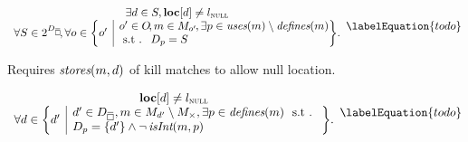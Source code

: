 

\begin{equation}
  \begin{array}{c}
    \exists d \in S, \mVar{loc}[d] \neq \mNullLocation \\
    \forall S \in \mPowerset{\mStateDataCompSet} \hspace{-2pt},
    \forall o \in
      \mSetBuilder*{o'}%
                   {%
                     \begin{array}{@{}l@{}}
                       o' \in \mOpSet \!,
                       m \in \mMatchSet[o'] \hspace{-1pt},
                       \exists p \in \mUses(m) \setminus \mDefines(m) \\
                       \text{\st }
                       \mDataSet[p] = S
                     \end{array}
                   } \!.
  \end{array}
  \labelEquation{todo}
\end{equation}

Requires \mbox{$\operatorname{\textit{stores}}(m, d)$} of kill matches to allow null location.


%
%

\begin{equation}
  \begin{array}{c}
    \mVar{loc}[d] \neq \mNullLocation \\
    \forall d \in
      \mSetBuilder*{d'}%
                   {%
                     \begin{array}{@{}l@{}}
                       d' \in \mStateDataCompSet,
                       m \in \mMatchSet[d'] \setminus \mKillMatchSet,
                       \exists p \in \mDefines(m) \text{ \st} \\
                       \mDataSet[p] = \mSet{d'}
                       \mAnd
                       \neg\mIsInt(m, p)
                     \end{array}
                   } \!.
  \end{array}
  \labelEquation{todo}
\end{equation}


